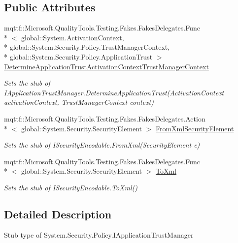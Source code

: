 \subsection*{Public Attributes}
\begin{DoxyCompactItemize}
\item 
mqttf\-::\-Microsoft.\-Quality\-Tools.\-Testing.\-Fakes.\-Fakes\-Delegates.\-Func\\*
$<$ global\-::\-System.\-Activation\-Context, \\*
global\-::\-System.\-Security.\-Policy.\-Trust\-Manager\-Context, \\*
global\-::\-System.\-Security.\-Policy.\-Application\-Trust $>$ \hyperlink{class_system_1_1_security_1_1_policy_1_1_fakes_1_1_stub_i_application_trust_manager_a54495b88bbf0d63d242856da0fa9f6df}{Determine\-Application\-Trust\-Activation\-Context\-Trust\-Manager\-Context}
\begin{DoxyCompactList}\small\item\em Sets the stub of I\-Application\-Trust\-Manager.\-Determine\-Application\-Trust(\-Activation\-Context activation\-Context, Trust\-Manager\-Context context)\end{DoxyCompactList}\item 
mqttf\-::\-Microsoft.\-Quality\-Tools.\-Testing.\-Fakes.\-Fakes\-Delegates.\-Action\\*
$<$ global\-::\-System.\-Security.\-Security\-Element $>$ \hyperlink{class_system_1_1_security_1_1_policy_1_1_fakes_1_1_stub_i_application_trust_manager_ab14590f083658a7e77ef835f0d8b7916}{From\-Xml\-Security\-Element}
\begin{DoxyCompactList}\small\item\em Sets the stub of I\-Security\-Encodable.\-From\-Xml(\-Security\-Element e)\end{DoxyCompactList}\item 
mqttf\-::\-Microsoft.\-Quality\-Tools.\-Testing.\-Fakes.\-Fakes\-Delegates.\-Func\\*
$<$ global\-::\-System.\-Security.\-Security\-Element $>$ \hyperlink{class_system_1_1_security_1_1_policy_1_1_fakes_1_1_stub_i_application_trust_manager_ae8180d3c9523ad5168869cf38453a032}{To\-Xml}
\begin{DoxyCompactList}\small\item\em Sets the stub of I\-Security\-Encodable.\-To\-Xml()\end{DoxyCompactList}\end{DoxyCompactItemize}


\subsection{Detailed Description}
Stub type of System.\-Security.\-Policy.\-I\-Application\-Trust\-Manager



